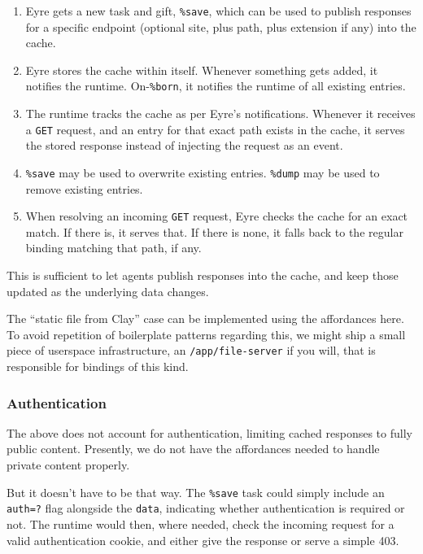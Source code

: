 \documentclass[twoside]{article}
\begin{document}
\begin{enumerate}
  \item  Eyre gets a new task and gift, \lstinline[style=inlinecode]{%save}, which can be used to publish responses for a specific endpoint (optional site, plus path, plus extension if any) into the cache.
  \item  Eyre stores the cache within itself. Whenever something gets added, it notifies the runtime. On-\lstinline[style=inlinecode]{%born}, it notifies the runtime of all existing entries.
  \item  The runtime tracks the cache as per Eyre's notifications. Whenever it receives a \texttt{GET} request, and an entry for that exact path exists in the cache, it serves the stored response instead of injecting the request as an event.
  \item  \lstinline[style=inlinecode]{%save} may be used to overwrite existing entries. \lstinline[style=inlinecode]{%dump} may be used to remove existing entries.
  \item  When resolving an incoming \texttt{GET} request, Eyre checks the cache for an exact match. If there is, it serves that. If there is none, it falls back to the regular binding matching that path, if any.
\end{enumerate}

This is sufficient to let agents publish responses into the cache, and keep those updated as the underlying data changes.

The ``static file from Clay'' case can be implemented using the affordances here. To avoid repetition of boilerplate patterns regarding this, we might ship a small piece of userspace infrastructure, an \lstinline[style=inlinecode]{/app/file-server} if you will, that is responsible for bindings of this kind.

\subsubsection{Authentication}

The above does not account for authentication, limiting cached responses to fully public content. Presently, we do not have the affordances needed to handle private content properly.

But it doesn't have to be that way. The \lstinline[style=inlinecode]{%save} task could simply include an \lstinline[style=inlinecode]{auth=?} flag alongside the \lstinline[style=inlinecode]{data}, indicating whether authentication is required or not. The runtime would then, where needed, check the incoming request for a valid authentication cookie, and either give the response or serve a simple 403.
\end{document}
